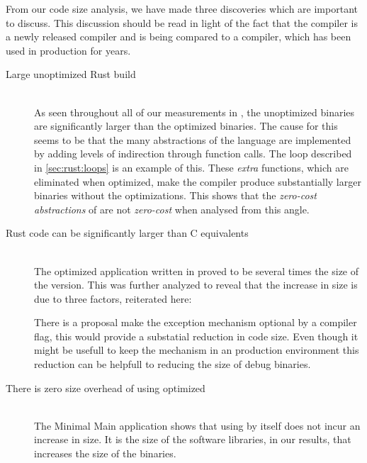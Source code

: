 From our code size analysis, we have made three discoveries which are important to discuss.
This discussion should be read in light of the fact that the {\rust} compiler is a newly released compiler and is being compared to a {\C} compiler, which has been used in production for years.

\begin{description}

\item [Large unoptimized Rust build] \hfill \\
  As seen throughout all of our measurements in {\rust}, the unoptimized binaries are significantly larger than the optimized binaries.
  The cause for this seems to be that the many abstractions of the {\rust} language are implemented by adding levels of indirection through function calls.
  The  loop described in \autoref{sec:rust:loops} is an example of this.
  These \emph{extra} functions, which are eliminated when optimized, make the compiler produce substantially larger binaries without the optimizations.
  This shows that the \emph{zero-cost abstractions} of {\rust} are not \emph{zero-cost} when analysed from this angle.

\item [Rust code can be significantly larger than C equivalents] \hfill \\
  The optimized {\tracker} application written in {\rust} proved to be several times the size of the {\C} version.
  This was further analyzed to reveal that the increase in size is due to three factors, reiterated here:
\begin{itemize}
\item The application code itself
\item The {\rust} Library
\item {\rust} exception mechanism (unwind)}
\end{itemize}
There is a proposal make the exception mechanism optional by a compiler flag, this would provide a substatial reduction in code size.
Even though it might be usefull to keep the mechanism in an production environment this reduction can be helpfull to reducing the size of debug binaries.

\item [There is zero size overhead of using optimized {\rust}] \hfill \\
  The Minimal Main application shows that using {\rust} by itself does not incur an increase in size.
  It is the size of the software libraries, in our results, that increases the size of the {\rust} binaries.

\end{description}

